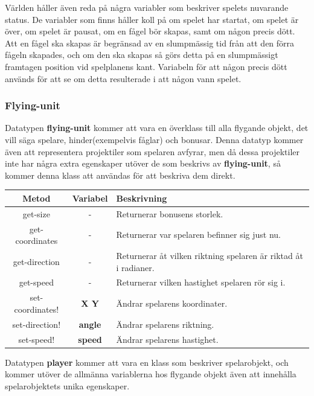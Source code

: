 \documentclass[12pt,a4paper]{article}
\newcounter{subsubsubsection}[subsubsection]
\begin{document}

Världen håller även reda på några variabler som beskriver spelets nuvarande status. De variabler som finns håller koll på om spelet har startat, om spelet är över, om spelet är pausat, om en fågel bör skapas, samt om någon precis dött. Att en fågel ska skapas är begränsad av en slumpmässig tid från att den förra fågeln skapades, och om den ska skapas så görs detta på en slumpmässigt framtagen position vid spelplanens kant. Variabeln för att någon precis dött används för att se om detta resulterade i att någon vann spelet.

\subsubsection{Flying-unit}
Datatypen \textbf{flying-unit} kommer att vara en överklass till alla flygande objekt, det vill säga spelare, hinder(exempelvis fåglar) och bonusar. Denna datatyp kommer även att representera projektiler som spelaren avfyrar, men då dessa projektiler inte har några extra egenskaper utöver de som beskrivs av \textbf{flying-unit}, så kommer denna klass att användas för att beskriva dem direkt.
\vspace{0.2cm}

\begin{tabular}{| c | c | p{8.3cm} |}
	\hline
	\textbf{Metod} & \textbf{Variabel} & \textbf{Beskrivning} \\
	\hline
	 
	 get-size & - & Returnerar bonusens storlek. \\
	 \hline
	 get-coordinates & - & Returnerar var spelaren befinner sig just nu. \\
	 \hline
	 get-direction & - & Returnerar åt vilken riktning spelaren är riktad åt i radianer.\\
	 \hline
	 get-speed & - & Returnerar vilken hastighet spelaren rör sig i.\\
	 \hline
	 set-coordinates! & \small\textbf{X Y} & Ändrar spelarens koordinater. \\
	 \hline
	 set-direction! & \small\textbf{angle} & Ändrar spelarens riktning. \\
	 \hline
	 set-speed! & \small\textbf{speed} & Ändrar spelarens hastighet. \\
	 \hline
\end{tabular}


Datatypen \textbf{player} kommer att vara en klass som beskriver spelarobjekt, och kommer utöver de allmänna variablerna hos flygande objekt även att innehålla spelarobjektets unika egenskaper.
\end{document}
